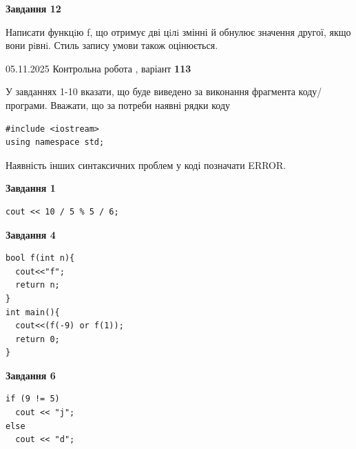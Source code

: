 \documentclass[12pt, ukrainian]{article}
\begin{document}
{\begin {large}
\begin{minipage}[t]{11.0cm}
\begin{center}
\textbf{Завдання 12}
\end{center}

Написати функцiю f, що отримує дві цiлi змінні й обнулює значення другої, якщо вони рiвнi. Стиль запису умови також оцінюється.\par

\end{minipage}

\end {large}}
\newpage

{\Large{05.11.2025 Контрольна робота , варіант  \No \textbf { 113 }\par}}
{
\begin {large}
У завданнях 1-10 вказати, що буде виведено за виконання фрагмента коду/про\-гра\-ми.
Вважати, що за потреби наявні рядки коду
\begin{verbatim}
#include <iostream>
using namespace std;
\end{verbatim}
Наявність інших синтаксичних проблем у коді позначати ERROR.

\begin{minipage}[t]{7.0cm}

\begin{center}
\textbf{Завдання 1}
\end{center}
\vspace{-8mm}

\begin{verbatim}
cout << 10 / 5 % 5 / 6;
\end{verbatim}



\begin{center}
\textbf{Завдання 4}
\end{center}
\vspace{-8mm}

\begin{verbatim}
bool f(int n){
  cout<<"f";
  return n;
}
int main(){
  cout<<(f(-9) or f(1));
  return 0;
}
\end{verbatim}



\begin{center}
\textbf{Завдання 6}
\end{center}
\vspace{-8mm}

\begin{verbatim}
if (9 != 5)
  cout << "j";
else
  cout << "d";
\end{verbatim}




\end{minipage}
\end{large}}
\end{document}
